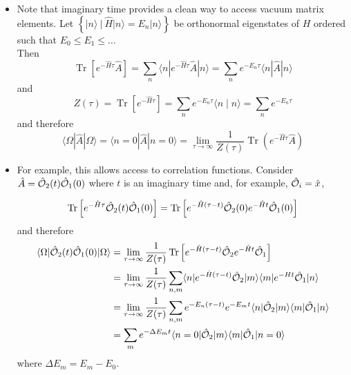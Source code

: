 \begin{itemize}
  \item Note that imaginary time provides a clean way to access vacuum matrix elements. Let \(\left\{|n\rangle\ |\ \hat{H}| n\rangle=E_{n}|n\rangle\right\}\) be orthonormal eigenstates of \(H\) ordered such that \(E_{0} \leq E_{1} \leq \ldots\)\\
Then
\begin{equation}
\operatorname{Tr}\left[e^{-\hat{H}{\tau}} \hat{A}\right]=\sum_{n}\langle n| e^{-\hat{H}{\tau}} \hat{A}|n\rangle=\sum_{n} e^{-E_{n} \tau}\langle n| \hat{A}|n\rangle
\end{equation}
and
\begin{equation}
 Z(\tau)=\operatorname{Tr}\left[e^{-\hat{H} \tau}\right]=\sum_{n} e^{-E_{n} \tau}\langle n \mid n\rangle=\sum_{n} e^{-E_{n} \tau} \end{equation}
 and therefore 
 \begin{equation}
\langle\Omega| \hat{A}|\Omega\rangle=\langle n=0| \hat{A}|n=0\rangle=\lim _{\tau \rightarrow \infty} \frac{1}{Z(\tau)} \operatorname{Tr}\left(e^{-\hat{H} \tau} \hat{A}\right)
\end{equation}
\end{itemize}

\begin{itemize}
  \item For example, this allows access to correlation functions. Consider \(\hat{A}=\hat{\cal O}_{2}(t) \hat{\cal O}_{1}(0)\) where \(t\) is an imaginary time and, for example, $\hat {\cal O}_i=\hat x$,

  \begin{equation} \operatorname{Tr}\left[e^{-\hat{H} \tau} \hat{\cal O}_{2}(t) \hat{\cal O}_{1}(0)\right]=\operatorname{Tr}\left[e^{-\hat{H}(\tau-t)} \hat{\cal O}_{2}(0) e^{-\hat{H} t} \hat{\cal O}_{1}(0)\right] \end{equation}
and therefore
  \begin{equation}
  \begin{aligned}
 \langle\Omega| \hat{\cal O}_{2}(t) \hat{\cal O}_{1}(0)|\Omega\rangle &=\lim _{\tau \rightarrow \infty} \frac{1}{Z(\tau)} \operatorname{Tr}\left[e^{-\hat{H}(\tau-t)} \hat{\cal O}_{2} e^{-\hat{H} t} \hat{\cal O}_{1}\right] \\
& =\lim _{\tau \rightarrow \infty} \frac{1}{Z(\tau)} \sum_{n,m}\langle n| e^{-\hat{H}(\tau-t)} \hat{\cal O}_{2}|m\rangle\langle m| e^{-H t} \hat{\cal O}_{1}|n\rangle \\
& =\lim _{\tau\to\infty} \frac{1}{Z(\tau)} \sum_{n, m} e^{-E_{n}(\tau-t)} e^{-E_{m} t}\langle n| \hat{\cal O}_{2}|m\rangle\langle m| \hat{\cal O}_1|n\rangle \\
& =\sum_{m} e^{-\Delta E_{m} t}\langle n=0| \hat{\cal O}_{2}|m\rangle\langle m| \hat{\cal O}_1|n=0\rangle
\end{aligned}
\end{equation}
where $\Delta E_{m}=E_{m}-E_{0}$.

\end{itemize}
